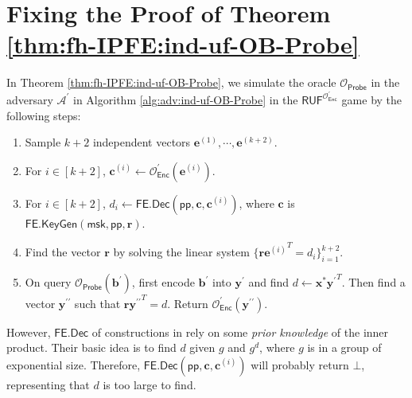 \iffalse

\section{Fixing the Proof of Theorem \ref{thm:fh-IPFE:ind-uf-OB-Probe}}

In Theorem \ref{thm:fh-IPFE:ind-uf-OB-Probe}, we simulate the oracle $\mathcal{O}_{\textsf{Probe}}$ in the adversary $\mathcal{A}^\prime$ in Algorithm \ref{alg:adv:ind-uf-OB-Probe} in the $\textsf{RUF}^{ \mathcal{O}^\prime_{\textsf{Enc}} }$ game by the following steps:

\begin{enumerate}

\item Sample $k+2$ independent vectors $\mathbf{e}^{(1)}, \cdots, \mathbf{e}^{(k+2)}$.

\item For $i \in [k+2]$, $\mathbf{c}^{(i)} \gets \mathcal{O}^\prime_{\textsf{Enc}}(\mathbf{e}^{(i)})$.

\item For $i \in [k+2]$,  $d_i \gets \textsf{FE.Dec}(\textsf{pp}, \mathbf{c}, \mathbf{c}^{(i)})$, where $\mathbf{c}$ is $\textsf{FE.KeyGen}(\textsf{msk}, \textsf{pp}, \mathbf{r})$.

\item Find the vector $\mathbf{r}$ by solving the linear system $\{ \mathbf{r} {\mathbf{e}^{(i)}}^T = d_i \}_{i=1}^{k+2}$.

\item On query $\mathcal{O}_{\textsf{Probe}}(\mathbf{b}^\prime)$, first encode $\mathbf{b}^\prime$ into $\mathbf{y}^\prime$ and find $d \gets \mathbf{x}^{*}{\mathbf{y}^\prime}^T$. Then find a vector $\mathbf{y}^{\prime\prime}$ such that $\mathbf{r} {\mathbf{y}^{\prime\prime}}^T = d$. Return $\mathcal{O}^\prime_{\textsf{Enc}}(\mathbf{y}^{\prime\prime})$.

\end{enumerate}

However, $\textsf{FE.Dec}$ of constructions in \cite{cryptoeprint:2015/1255, 10.1007/978-3-319-45871-7_24, cryptoeprint:2016/440} rely on some \emph{prior knowledge} of the inner product. Their basic idea is to find $d$ given $g$ and $g^d$, where $g$ is in a group of exponential size. Therefore, $\textsf{FE.Dec}(\textsf{pp}, \mathbf{c}, \mathbf{c}^{(i)})$ will probably return $\bot$, representing that $d$ is too large to find.

